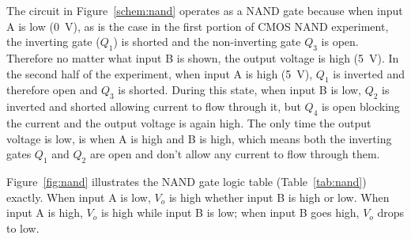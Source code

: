 The circuit in Figure~\ref{schem:nand} operates as a NAND gate because when input A is low (\SI{0}{V}), as is the case in the first portion of CMOS NAND experiment, the inverting gate ($Q_1$) is shorted and the non-inverting gate $Q_3$ is open.  Therefore no matter what input B is shown, the output voltage is high (\SI{5}{V}).  In the second half of the experiment, when input A is high (\SI{5}{V}), $Q_1$ is inverted and therefore open and $Q_3$ is shorted. During this state, when input B is low, $Q_2$ is inverted and shorted allowing current to flow through it, but $Q_4$ is open blocking the current and the output voltage is again high.  The only time the output voltage is low, is when A is high and B is high, which means both the inverting gates $Q_1$ and $Q_2$ are open and don't allow any current to flow through them.

Figure~\ref{fig:nand} illustrates the NAND gate logic table (Table~\ref{tab:nand}) exactly.  When input A is low, $V_o$ is high whether input B is high or low.  When input A is high, $V_o$ is high while input B is low; when input B goes high, $V_o$ drops to low.




